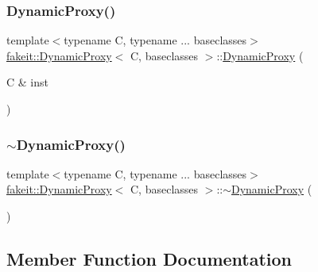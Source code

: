 \subsubsection{\texorpdfstring{DynamicProxy()}{DynamicProxy()}\hspace{0.1cm}{\footnotesize\ttfamily [9/9]}}
{\footnotesize\ttfamily template$<$typename C, typename ... baseclasses$>$ \\
\mbox{\hyperlink{structfakeit_1_1DynamicProxy}{fakeit\+::\+Dynamic\+Proxy}}$<$ C, baseclasses $>$\+::\mbox{\hyperlink{structfakeit_1_1DynamicProxy}{Dynamic\+Proxy}} (\begin{DoxyParamCaption}\item[{C \&}]{inst }\end{DoxyParamCaption})\hspace{0.3cm}{\ttfamily [inline]}}

\mbox{\label{structfakeit_1_1DynamicProxy_a05e9d9c1bcaf4bcd14d1b6311e16c809}} 
\subsubsection{\texorpdfstring{$\sim$DynamicProxy()}{~DynamicProxy()}\hspace{0.1cm}{\footnotesize\ttfamily [9/9]}}
{\footnotesize\ttfamily template$<$typename C, typename ... baseclasses$>$ \\
\mbox{\hyperlink{structfakeit_1_1DynamicProxy}{fakeit\+::\+Dynamic\+Proxy}}$<$ C, baseclasses $>$\+::$\sim$\mbox{\hyperlink{structfakeit_1_1DynamicProxy}{Dynamic\+Proxy}} (\begin{DoxyParamCaption}{ }\end{DoxyParamCaption})\hspace{0.3cm}{\ttfamily [inline]}}



\subsection{Member Function Documentation}
\mbox{\label{structfakeit_1_1DynamicProxy_a995c7e3dd97dc7707f18774eb4554b45}} 
